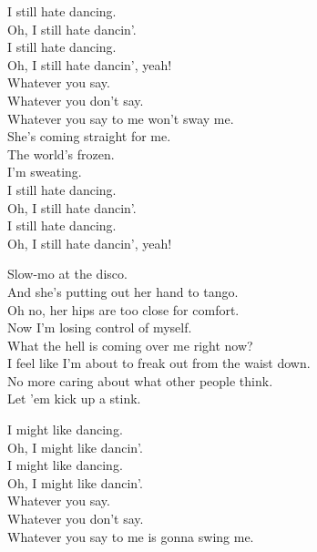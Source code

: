 

I still hate dancing. \\
Oh, I still hate dancin'. \\
I still hate dancing. \\
Oh, I still hate dancin', yeah! \\

Whatever you say. \\
Whatever you don't say. \\
Whatever you say to me won't sway me. \\

She's coming straight for me. \\
The world's frozen. \\
I'm sweating. \\

I still hate dancing. \\
Oh, I still hate dancin'. \\
I still hate dancing. \\
Oh, I still hate dancin', yeah! \\


Slow-mo at the disco. \\
And she's putting out her hand to tango. \\
Oh no, her hips are too close for comfort. \\
Now I'm losing control of myself. \\

What the hell is coming over me right now? \\
I feel like I'm about to freak out from the waist down. \\
No more caring about what other people think. \\
Let 'em kick up a stink. \\


I might like dancing. \\
Oh, I might like dancin'. \\
I might like dancing. \\
Oh, I might like dancin'. \\

Whatever you say. \\
Whatever you don't say. \\
Whatever you say to me is gonna swing me. \\

